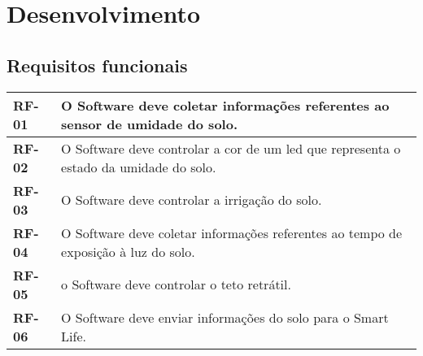 \chapter{Desenvolvimento}
    \section{Requisitos funcionais}
        \begin{table}[!htbp]
            \centering
            \renewcommand{\arraystretch}{1.3}
            \label{tab:quadro_requisitos}
            \begin{tabular}{| L{3cm} | L{11cm} | }
                \hline
                \textbf{RF-01} & O Software deve coletar informações referentes ao sensor de umidade do solo.\\
                \hline

                \hline
                \textbf{RF-02} & O Software deve controlar a cor de um led que representa o estado da umidade do solo.\\
                \hline                   

                \hline
                \textbf{RF-03} & O Software deve controlar a irrigação do solo.\\
                \hline

                \hline
                \textbf{RF-04} & O Software deve coletar informações referentes ao tempo de exposição à luz do solo.\\
                \hline

                \hline
                \textbf{RF-05} & o Software deve controlar o teto retrátil.\\
                \hline

                \hline
                \textbf{RF-06} & O Software deve enviar informações do solo para o Smart Life.\\
                \hline

            \end{tabular}
            \vspace{2mm}
        \end{table}

